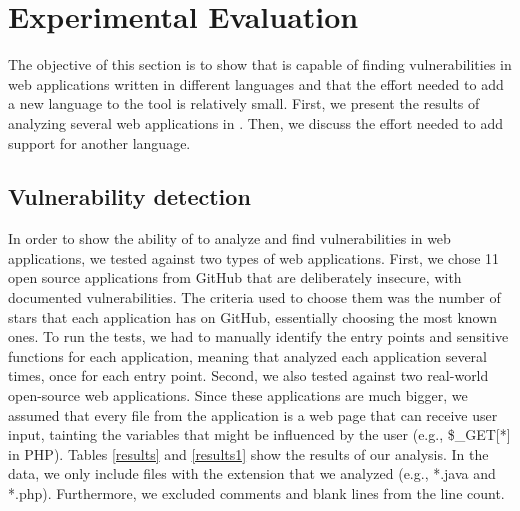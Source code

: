\section{Experimental Evaluation}

The objective of this section is to show that \toolname{} is capable of finding vulnerabilities in web applications written in different languages and that the effort needed to add a new language to the tool is relatively small. First, we present the results of analyzing several web applications in \implangs{}. Then, we discuss the effort needed to add support for another language.

\subsection{Vulnerability detection}
In order to show the ability of \toolname{} to analyze and find vulnerabilities in web applications, we tested \toolname{} against two types of web applications. First, we chose 11 open source applications from GitHub that are deliberately insecure, with documented vulnerabilities. The criteria used to choose them was the number of stars that each application has on GitHub, essentially choosing the most known ones. To run the tests, we had to manually identify the entry points and sensitive functions for each application, meaning that \toolname{} analyzed each application several times, once for each entry point. Second, we also tested \toolname{} against two real-world open-source web applications. Since these applications are much bigger, we assumed that every file from the application is a web page that can receive user input, tainting the variables that might be influenced by the user (e.g., \$\_GET[*] in PHP). Tables \ref{results} and \ref{results1} show the results of our analysis. In the data, we only include files with the extension that we analyzed (e.g., *.java and *.php). Furthermore, we excluded comments and blank lines from the line count. 


